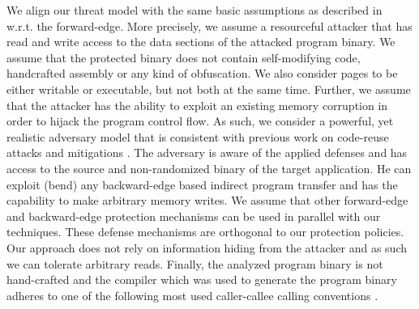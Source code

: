 We align our threat model with the same basic assumptions as described in~\cite{veen:typearmor} w.r.t. the forward-edge.
More precisely, we assume a resourceful attacker that has read and write access to the data 
sections of the attacked program binary. We assume that the protected binary does not contain 
self-modifying code, handcrafted assembly or any kind of obfuscation. We also consider pages 
to be either writable or executable, but not both at the same time. Further, we assume 
that the attacker has the ability to exploit an existing memory corruption in order to hijack the program
control flow. 
As such, we consider a powerful, yet realistic adversary
model that is consistent with previous work on code-reuse
attacks and mitigations \cite{volodymyr:cpi}. 
The adversary is aware of the
applied defenses and has access to the source and non-randomized 
binary of the target application.
He can exploit (bend)
any backward-edge based indirect program transfer and
has the capability to make arbitrary memory writes. 
We assume that other forward-edge and backward-edge protection mechanisms
can be used in parallel with our techniques.
These defense
mechanisms are orthogonal to our protection policies. Our
approach does not rely on information hiding from the
attacker and as such we can tolerate arbitrary reads. 
Finally, the analyzed program binary is not hand-crafted and the compiler which was used
to generate the program binary adheres to one of the 
following most used caller-callee calling conventions \cite{arm:abi, microsoft:abi, itanium:abi}.


